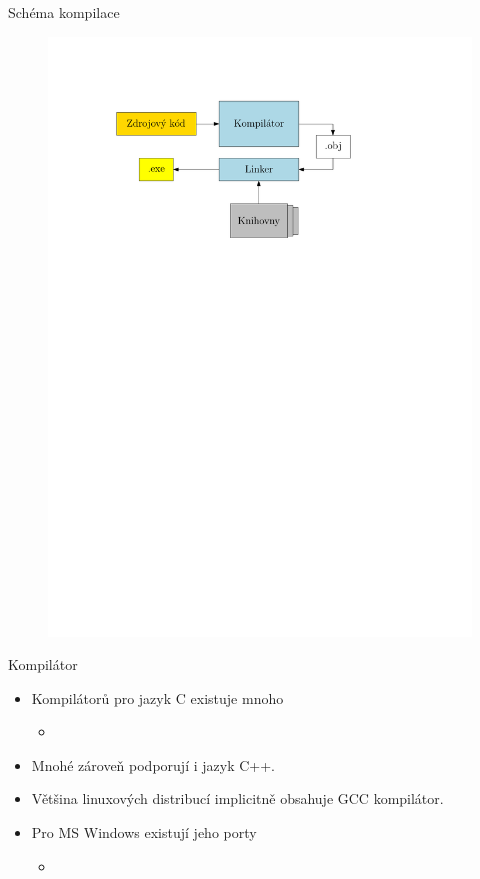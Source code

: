 \documentclass[14pt]{beamer}
\begin{document}
    \begin{frame}[t]{Schéma kompilace}
        \begin{figure}[h]
            \centering
            \includegraphics[scale=.8]{images/compiling.pdf}
        \end{figure}
    \end{frame}

    \begin{frame}[t]{Kompilátor}
        \begin{itemize}
            \item Kompilátorů pro jazyk C existuje mnoho
            \begin{itemize}
                \item {}
            \end{itemize}
            \item Mnohé zároveň podporují i jazyk C++.
            \item Většina linuxových distribucí implicitně obsahuje GCC kompilátor.
            \item Pro MS Windows existují jeho porty
            \begin{itemize}
                \item {}
            \end{itemize}
        \end{itemize}
    \end{frame}
\end{document}
